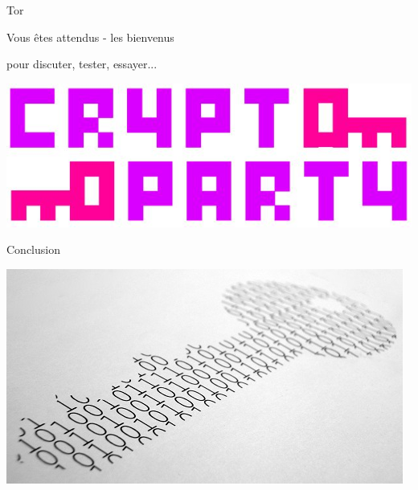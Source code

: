 \documentclass{beamer}
\begin{document}
\begin{frame}
\begin{block}{Tor}
\end{block}

\end{frame}

\begin{frame}
\Huge{\centerline{Vous êtes attendus - les bienvenus}}
\Huge{\centerline{pour discuter, tester, essayer...}}
\begin{center}
\includegraphics[scale=0.4] {./Illustrations/cryptoparty.jpg} 
\end{center}
\end{frame}

\begin{frame}
\Huge{\centerline{Conclusion}}
\begin{center}
\includegraphics[scale=0.4] {./Illustrations/cryptography.jpg} 
\end{center}
\end{frame}
\end{document}
